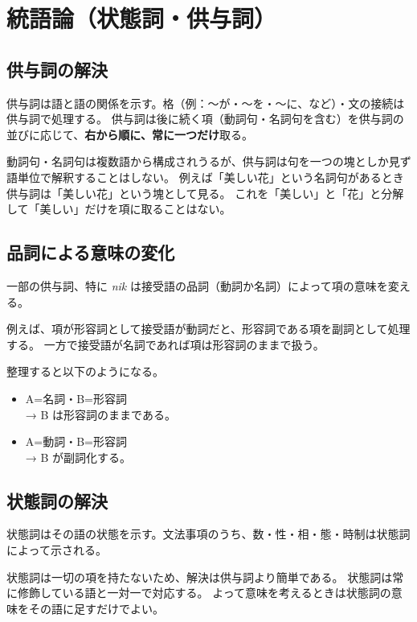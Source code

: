 \chapter{統語論（状態詞・供与詞）}

\section{供与詞の解決}

供与詞は語と語の関係を示す。格（例：～が・～を・～に、など）・文の接続は供与詞で処理する。
供与詞は後に続く項（動詞句・名詞句を含む）を供与詞の並びに応じて、\textbf{右から順に、常に一つだけ}取る。

動詞句・名詞句は複数語から構成されうるが、供与詞は句を一つの塊としか見ず語単位で解釈することはしない。
例えば「美しい花」という名詞句があるとき供与詞は「美しい花」という塊として見る。
これを「美しい」と「花」と分解して「美しい」だけを項に取ることはない。

\section{品詞による意味の変化}

一部の供与詞、特に \emph{nik} は接受語の品詞（動詞か名詞）によって項の意味を変える。

例えば、項が形容詞として接受語が動詞だと、形容詞である項を副詞として処理する。
一方で接受語が名詞であれば項は形容詞のままで扱う。

整理すると以下のようになる。

\begin{itemize}
    \item A=名詞・B=形容詞 \\ → B は形容詞のままである。
    \item A=動詞・B=形容詞 \\ → B が副詞化する。
\end{itemize}

\section{状態詞の解決}

状態詞はその語の状態を示す。文法事項のうち、数・性・相・態・時制は状態詞によって示される。

状態詞は一切の項を持たないため、解決は供与詞より簡単である。
状態詞は常に修飾している語と一対一で対応する。
よって意味を考えるときは状態詞の意味をその語に足すだけでよい。